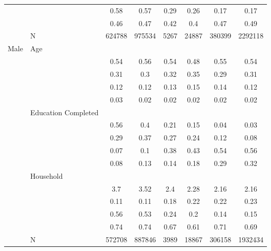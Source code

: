 \documentclass[
]{article}
\begin{document}
\begin{landscape}
\begin{table}[ht]
\begin{tabular}{l>{\raggedright\arraybackslash}p{3.2cm}|cccccc}
   & \multicolumn{1}{>{\raggedleft\arraybackslash}p{2.9cm}|}{\makebox[2.9cm][r]{Lives with Child }} & 0.58 & 0.57 & 0.29 & 0.26 & 0.17 & 0.17 \\ 
   & \multicolumn{1}{>{\raggedleft\arraybackslash}p{3.4cm}|}{\makebox[3.4cm][r]{Married/Cohabiting }} & 0.46 & 0.47 & 0.42 & 0.4 & 0.47 & 0.49 \\ 
   & N & 624788 & 975534 & 5267 & 24887 & 380399 & 2292118 \\ 
  Male & Age &  &  &  &  &  &  \\ 
   & \multicolumn{1}{>{\raggedleft\arraybackslash}p{1.5cm}|}{\makebox[1.5cm][r]{60 - 69 }} & 0.54 & 0.56 & 0.54 & 0.48 & 0.55 & 0.54 \\ 
   & \multicolumn{1}{>{\raggedleft\arraybackslash}p{1.5cm}|}{\makebox[1.5cm][r]{70 - 79 }} & 0.31 & 0.3 & 0.32 & 0.35 & 0.29 & 0.31 \\ 
   & \multicolumn{1}{>{\raggedleft\arraybackslash}p{1.5cm}|}{\makebox[1.5cm][r]{80 - 89 }} & 0.12 & 0.12 & 0.13 & 0.15 & 0.14 & 0.12 \\ 
   & \multicolumn{1}{>{\raggedleft\arraybackslash}p{1.5cm}|}{\makebox[1.5cm][r]{90 plus }} & 0.03 & 0.02 & 0.02 & 0.02 & 0.02 & 0.02 \\ 
   & Education Completed &  &  &  &  &  &  \\ 
   & \multicolumn{1}{>{\raggedleft\arraybackslash}p{3.2cm}|}{\makebox[3.2cm][r]{Less than Primary }} & 0.56 & 0.4 & 0.21 & 0.15 & 0.04 & 0.03 \\ 
   & \multicolumn{1}{>{\raggedleft\arraybackslash}p{1.7cm}|}{\makebox[1.7cm][r]{Primary }} & 0.29 & 0.37 & 0.27 & 0.24 & 0.12 & 0.08 \\ 
   & \multicolumn{1}{>{\raggedleft\arraybackslash}p{2cm}|}{\makebox[2cm][r]{Secondary }} & 0.07 & 0.1 & 0.38 & 0.43 & 0.54 & 0.56 \\ 
   & \multicolumn{1}{>{\raggedleft\arraybackslash}p{2cm}|}{\makebox[2cm][r]{University }} & 0.08 & 0.13 & 0.14 & 0.18 & 0.29 & 0.32 \\ 
   & Household &  &  &  &  &  &  \\ 
   & \multicolumn{1}{>{\raggedleft\arraybackslash}p{2.7cm}|}{\makebox[2.7cm][r]{Household Size }} & 3.7 & 3.52 & 2.4 & 2.28 & 2.16 & 2.16 \\ 
   & \multicolumn{1}{>{\raggedleft\arraybackslash}p{2.2cm}|}{\makebox[2.2cm][r]{Lives Alone }} & 0.11 & 0.11 & 0.18 & 0.22 & 0.22 & 0.23 \\ 
   & \multicolumn{1}{>{\raggedleft\arraybackslash}p{2.9cm}|}{\makebox[2.9cm][r]{Lives with Child }} & 0.56 & 0.53 & 0.24 & 0.2 & 0.14 & 0.15 \\ 
   & \multicolumn{1}{>{\raggedleft\arraybackslash}p{3.4cm}|}{\makebox[3.4cm][r]{Married/Cohabiting }} & 0.74 & 0.74 & 0.67 & 0.61 & 0.71 & 0.69 \\ 
   & N & 572708 & 887846 & 3989 & 18867 & 306158 & 1932434 \\ 
   \hline
\end{tabular}
\endgroup
\end{table}

\end{landscape}
\end{document}

